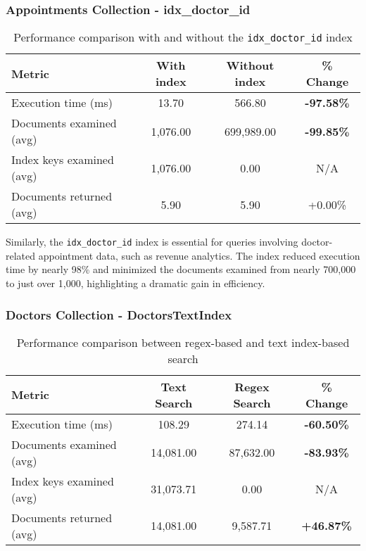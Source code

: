 \subsubsection{Appointments Collection - idx\_doctor\_id}


\begin{table}[H]
\centering
\caption{Performance comparison with and without the \texttt{idx\_doctor\_id} index}
\begin{tabular}{lccc}
\toprule
\textbf{Metric} & \textbf{With index} & \textbf{Without index} & \textbf{\% Change} \\
\midrule
Execution time (ms)         & 13.70      & 566.80     & \textbf{-97.58\%} \\
Documents examined (avg)         & 1,076.00   & 699,989.00 & \textbf{-99.85\%} \\
Index keys examined (avg)       & 1,076.00   & 0.00       & N/A \\
Documents returned (avg)         & 5.90       & 5.90       & +0.00\% \\
\bottomrule
\end{tabular}
\label{tab:doctor_idx_performance}
\end{table}

Similarly, the \texttt{idx\_doctor\_id} index is essential for queries involving doctor-related appointment data, such as revenue analytics. The index reduced execution time by nearly 98\% and minimized the documents examined from nearly 700,000 to just over 1,000, highlighting a dramatic gain in efficiency.

\subsubsection{Doctors Collection - DoctorsTextIndex}


\begin{table}[H]
\centering
\caption{Performance comparison between regex-based and text index-based search}
\begin{tabular}{lccc}
\toprule
\textbf{Metric} & \textbf{Text Search} & \textbf{Regex Search} & \textbf{\% Change} \\
\midrule
Execution time (ms)         & 108.29     & 274.14     & \textbf{-60.50\%} \\
Documents examined (avg)         & 14,081.00  & 87,632.00  & \textbf{-83.93\%} \\
Index keys examined (avg)        & 31,073.71  & 0.00       & N/A \\
Documents returned (avg)         & 14,081.00  & 9,587.71   & \textbf{+46.87\%} \\
\bottomrule
\end{tabular}
\label{tab:text_vs_regex}
\end{table}


